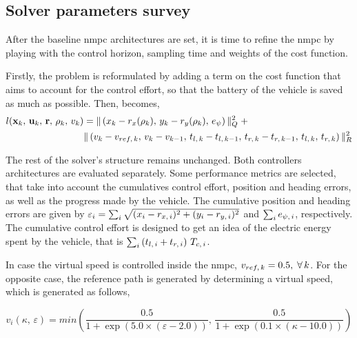 \subsection{Solver parameters survey}
\label{subsection:solverspecssurvey}

After the baseline \acrshort{nmpc} architectures are set, it is time to refine the \acrshort{nmpc} by playing with the control horizon, sampling time and weights of the cost function.

Firstly, the problem is reformulated by adding a term on the cost function that aims to account for the control effort, so that the battery of the vehicle is saved as much as possible. Then,  becomes,
\begin{equation}
	\begin{split}
		l(\mathbf{x}_k,\,\mathbf{u}_k,\,\mathbf{r},\,\rho_k,\,v_k) &= \Vert\left(x_k - r_{x}(\rho_k),\,y_k - r_{y}(\rho_k),\,e_{\psi}\right)\Vert_Q^2 \; +\\&\Vert\left(v_k - v_{ref,\,k},\, v_k - v_{k-1},\,t_{l,\,k} - t_{l,\,k-1},\,t_{r,\,k} - t_{r,\,k-1},\,t_{l,\,k},\,t_{r,\,k}\right)\Vert_R^2
	\end{split}
	\label{eq:reflagrange}
\end{equation}

The rest of the solver's structure remains unchanged. Both controllers architectures are evaluated separately. Some performance metrics are selected, that take into account the cumulatives control effort, position and heading errors, as well as the progress made by the vehicle. The cumulative position and heading errors are given by $\varepsilon_i = \sum_i \sqrt{ (x_i - r_{x,\,i})^2 + (y_i - r_{y,\,i})^2 }$ and $\sum_i e_{\psi,\,i}$, respectively. The cumulative control effort is designed to get an idea of the electric energy spent by the vehicle, that is $\sum_i \left(t_{l,\,i} + t_{r,\,i}\right)\,T_{c,\,i}$.

In case the virtual speed is controlled inside the \acrshort{nmpc}, $v_{ref,\,k} = 0.5,\;\forall\,k$. For the opposite case, the reference path is generated by determining a virtual speed, which is generated as follows,

\begin{equation}
v_i\left(\kappa,\,\varepsilon\right) = min\left( \frac{0.5}{ 1 + \exp\left( 5.0\times( \varepsilon - 2.0 ) \right) },\, \frac{0.5}{ 1 + \exp\left( 0.1 \times ( \kappa - 10.0 ) \right) } \right)
\label{eq:vspeed_computation_architecture_b}
\end{equation}

